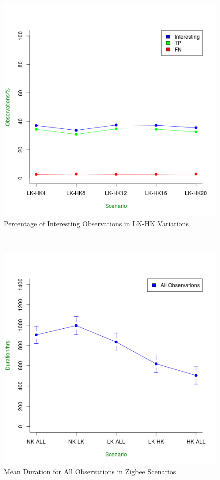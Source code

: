 \begin{figure}[!h]
\centering
\includegraphics[width=\textwidth]{Chap7/figures/khas_int_percent.png}
\caption{Percentage of Interesting Observations in LK-HK Variations}
\label{fig:khas_int_percent}
\end{figure}
\\
\begin{figure}[!h]
\centering
\includegraphics[width=\textwidth]{Chap7/figures/all_total.png}
\caption{Mean Duration for All Observations in Zigbee Scenarios}
\label{fig:all_total}
\end{figure}

